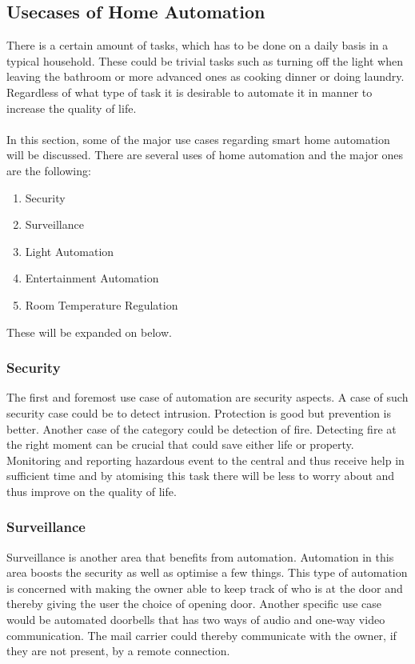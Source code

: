 \subsection{Usecases of Home Automation}
\label{sec:Usecases of Home Automation}
There is a certain amount of tasks, which has to be done on a daily basis in a typical household. These could be trivial tasks such as turning off the light when leaving the bathroom or more advanced ones as cooking dinner or doing laundry. Regardless of what type of task it is desirable to automate it in manner to increase the quality of life.
\\\\
In this section, some of the major use cases regarding smart home automation will be discussed. There are several uses of home automation and the major ones are the following:

\begin{enumerate}
  \item Security
  \item Surveillance
  \item Light Automation
  \item Entertainment Automation
  \item Room Temperature Regulation
\end{enumerate}
These will be expanded on below.

\subsubsection{Security}
\label{sub:Security}
The first and foremost use case of automation are security aspects. A case of such security case could be to detect intrusion. Protection is good but prevention is better. Another case of the category could be detection of fire. Detecting fire at the right moment can be crucial that could save either life or property. Monitoring and reporting hazardous event to the central and thus receive help in sufficient time and by atomising this task there will be less to worry about and thus improve on the quality of life.

\subsubsection{Surveillance} 
\label{sub:Surveillance}
Surveillance is another area that benefits from automation. Automation in this area boosts the security as well as optimise a few things. This type of automation is concerned with making the owner able to keep track of who is at the door and thereby giving the user the choice of opening door. Another specific use case would be automated doorbells that has two ways of audio and one-way video communication. The mail carrier could thereby communicate with the owner, if they are not present, by a remote connection. 

